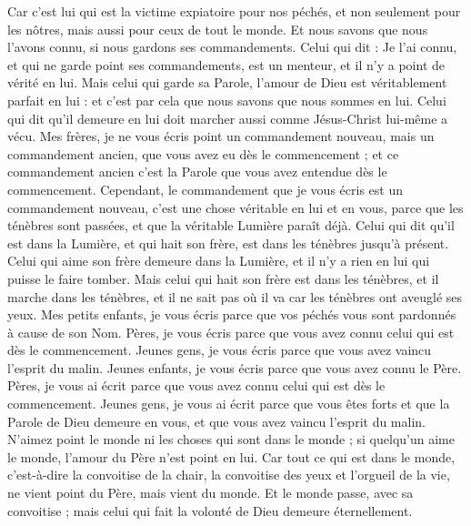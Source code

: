 \begin{multicols}{2}
Car c'est lui qui est la victime expiatoire pour nos péchés, et non seulement pour les nôtres, mais aussi pour ceux de tout le monde.
Et nous savons que nous l'avons connu, si nous gardons ses commandements.
Celui qui dit : Je l'ai connu, et qui ne garde point ses commandements, est un menteur, et il n'y a point de vérité en lui.
Mais celui qui garde sa Parole, l'amour de Dieu est véritablement parfait en lui : et c'est par cela que nous savons que nous sommes en lui.
Celui qui dit qu'il demeure en lui doit marcher aussi comme Jésus-Christ lui-même a vécu.
Mes frères, je ne vous écris point un commandement nouveau, mais un commandement ancien, que vous avez eu dès le commencement ; et ce commandement ancien c'est la Parole que vous avez entendue dès le commencement.
Cependant, le commandement que je vous écris est un commandement nouveau, c’est une chose véritable en lui et en vous, parce que les ténèbres sont passées, et que la véritable Lumière paraît déjà.
Celui qui dit qu'il est dans la Lumière, et qui hait son frère, est dans les ténèbres jusqu'à présent.
Celui qui aime son frère demeure dans la Lumière, et il n'y a rien en lui qui puisse le faire tomber.
Mais celui qui hait son frère est dans les ténèbres, et il marche dans les ténèbres, et il ne sait pas où il va car les ténèbres ont aveuglé ses yeux.
Mes petits enfants, je vous écris parce que vos péchés vous sont pardonnés à cause de son Nom.
Pères, je vous écris parce que vous avez connu celui qui est dès le commencement. Jeunes gens, je vous écris parce que vous avez vaincu l’esprit du malin.
Jeunes enfants, je vous écris parce que vous avez connu le Père. Pères, je vous ai écrit parce que vous avez connu celui qui est dès le commencement. Jeunes gens, je vous ai écrit parce que vous êtes forts et que la Parole de Dieu demeure en vous, et que vous avez vaincu l’esprit du malin.
N'aimez point le monde ni les choses qui sont dans le monde ; si quelqu'un aime le monde, l'amour du Père n'est point en lui.
Car tout ce qui est dans le monde, c'est-à-dire la convoitise de la chair, la convoitise des yeux et l'orgueil de la vie, ne vient point du Père, mais vient du monde.
Et le monde passe, avec sa convoitise ; mais celui qui fait la volonté de Dieu demeure éternellement.

\end{multicols}
